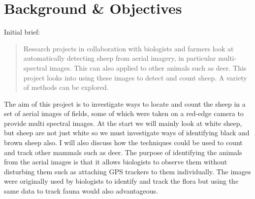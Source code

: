 \chapter{Background \& Objectives}
\begin{comment}
    This section should discuss your preparation for the project, including background reading, your analysis of the problem and the process or method you have followed to help structure your work.  It is likely that you will reuse part of your outline project specification, but at the end of the project you should have more to discuss. 

    \textbf{Note}: 

    \begin{itemize}
        \item All of the sections and text in this example are for illustration purposes. The main Chapters are a good starting point, but the content and actual sections that you include are likely to be different.
   
        \item  Look at the document MMP\_S08 Project Report and Technical Work \cite{ProjectReportTechicalWork} for additional guidance.
    \end{itemize}
\end{comment}

Initial brief:

\begin{quote}
Research projects in collaboration with biologists and farmers look at automatically detecting sheep from aerial imagery, in particular multi-spectral images. This can also applied to other animals such as deer. This project looks into using these images to detect and count sheep. A variety of methods can be explored. 
\end{quote}

The aim of this project is to investigate ways to locate and count the sheep in a set of aerial images of fields, some of which were taken on a red-edge camera to provide multi spectral images. At the start we will mainly look at white sheep, but sheep are not just white so we must investigate ways of identifying black and brown sheep also. I will also discuss how the techniques could be used to count and track other mammals such as deer. The purpose of identifying the animals from the aerial images is that it allows biologists to observe them without disturbing them such as attaching GPS trackers to them individually. The images were originally used by biologists to identify and track the flora but using the same data to track fauna would also advantageous.



